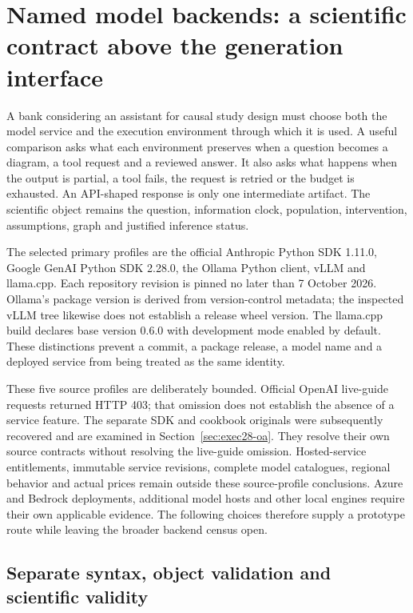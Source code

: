 \section{Named model backends: a scientific contract above the generation interface}
\label{sec:exec24-backend-census}

A bank considering an assistant for causal study design must choose both the
model service and the execution environment through which it is used. A useful
comparison asks what each environment preserves when a question becomes a
diagram, a tool request and a reviewed answer. It also asks what happens when
the output is partial, a tool fails, the request is retried or the budget is
exhausted. An API-shaped response is only one intermediate artifact. The
scientific object remains the question, information clock, population,
intervention, assumptions, graph and justified inference status.
\citep{exec24_backend_reference}

The selected primary profiles are the official Anthropic Python SDK 1.11.0,
Google GenAI Python SDK 2.28.0, the Ollama Python client, vLLM and llama.cpp.
Each repository revision is pinned no later than 7 October 2026. Ollama's
package version is derived from version-control metadata; the inspected
vLLM tree likewise does not establish a release wheel version. The llama.cpp
build declares base version 0.6.0 with development mode enabled by default.
These distinctions prevent a commit, a package release, a model name and a
deployed service from being treated as the same identity.
\citep{exec24_backend_anthropic,exec24_backend_google,exec24_backend_ollama,
exec24_backend_vllm,exec24_backend_llamacpp}

These five source profiles are deliberately bounded. Official OpenAI live-guide
requests returned HTTP 403; that omission does not establish the absence of a
service feature. The separate SDK and cookbook originals were subsequently
recovered and are examined in Section~\ref{sec:exec28-oa}. They resolve their
own source contracts without resolving the live-guide omission. Hosted-service
entitlements, immutable service revisions, complete model catalogues, regional
behavior and actual prices remain outside these source-profile conclusions. Azure and Bedrock deployments, additional
model hosts and other local engines require their own applicable evidence.
The following choices therefore supply a prototype route while leaving the
broader backend census open.~\citep{exec24_backend_reference}

\subsection{Separate syntax, object validation and scientific validity}

